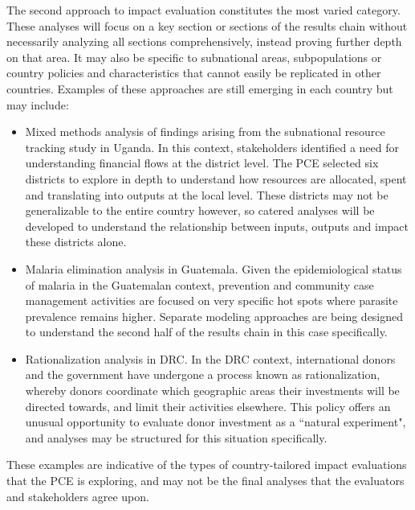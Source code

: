 \documentclass[twocolumn]{bmcart}%
\begin{document}
The second approach to impact evaluation constitutes the most varied category. These analyses will focus on a key section or sections of the results chain without necessarily analyzing all sections comprehensively, instead proving further depth on that area. It may also be specific to subnational areas, subpopulations or country policies and characteristics that cannot easily be replicated in other countries. Examples of these approaches are still emerging in each country but may include:

\begin{itemize}
  \item Mixed methods analysis of findings arising from the subnational resource tracking study in Uganda. In this context, stakeholders identified a need for understanding financial flows at the district level. The PCE selected six districts to explore in depth to understand how resources are allocated, spent and translating into outputs at the local level. These districts may not be generalizable to the entire country however, so catered analyses will be developed to understand the relationship between inputs, outputs and impact these districts alone.
  \item Malaria elimination analysis in Guatemala. Given the epidemiological status of malaria in the Guatemalan context, prevention and community case management activities are focused on very specific hot spots where parasite prevalence remains higher. Separate modeling approaches are being designed to understand the second half of the results chain in this case specifically.
  \item Rationalization analysis in DRC. In the DRC context, international donors and the government have undergone a process known as rationalization, whereby donors coordinate which geographic areas their investments will be directed towards, and limit their activities elsewhere. This policy offers an unusual opportunity to evaluate donor investment as a ``natural experiment", and analyses may be structured for this situation specifically.
\end{itemize}

These examples are indicative of the types of country-tailored impact evaluations that the PCE is exploring, and may not be the final analyses that the evaluators and stakeholders agree upon. \\


\end{document}
